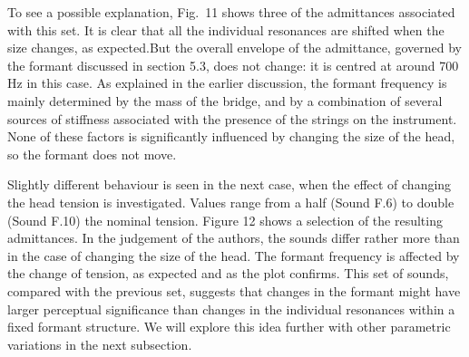 



  To see a possible explanation, Fig.\ 11 shows three of the admittances 
  associated with this set. It is clear that all the individual resonances are 
  shifted when the size changes, as expected.But the overall envelope of the 
  admittance, governed by the formant discussed in section 5.3, does not 
  change: it is centred at around 700 Hz in this case. As explained in the 
  earlier discussion, the formant frequency is mainly determined by the mass of 
  the bridge, and by a combination of several sources of stiffness associated 
  with the presence of the strings on the instrument. None of these factors is 
  significantly influenced by changing the size of the head, so the formant 
  does not move. 


  Slightly different behaviour is seen in the next case, when the effect of 
  changing the head tension is investigated. Values range from a half (Sound 
  F.6) to double (Sound F.10) the nominal tension. Figure 12 shows a selection 
  of the resulting admittances. In the judgement of the authors, the sounds 
  differ rather more than in the case of changing the size of the head. The 
  formant frequency is affected by the change of tension, as expected and as 
  the plot confirms. This set of sounds, compared with the previous set, 
  suggests that changes in the formant might have larger perceptual 
  significance than changes in the individual resonances within a fixed formant 
  structure. We will explore this idea further with other parametric variations 
  in the next subsection. 

